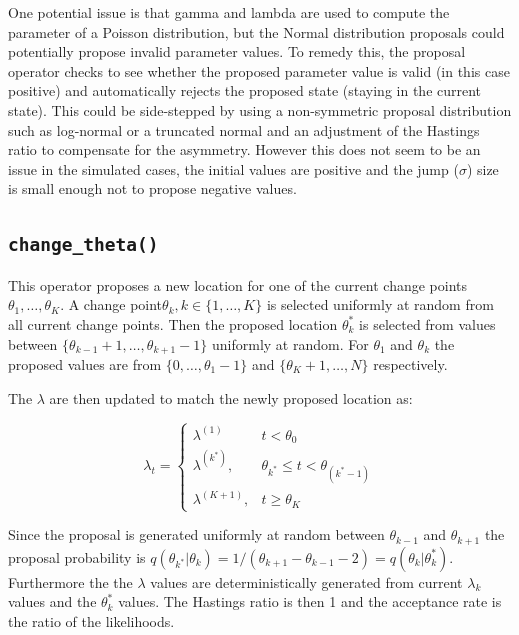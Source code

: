 \documentclass[11pt,a4paper]{article}
\numberwithin{equation}{section}
\begin{document}
One potential issue is that gamma and lambda are used to compute the
parameter of a Poisson distribution, but the Normal distribution
proposals could potentially propose invalid parameter values. To remedy
this, the proposal operator checks to see whether the proposed parameter
value is valid (in this case positive) and automatically rejects the
proposed state (staying in the current state). This could be
side-stepped by using a non-symmetric proposal distribution such as
log-normal or a truncated normal and an adjustment of the Hastings ratio
to compensate for the asymmetry. However this does not seem to be an
issue in the simulated cases, the initial values are positive and the
jump (\(\sigma\)) size is small enough not to propose negative values.

\hypertarget{change_theta}{%
\subsection{\texorpdfstring{\texttt{change\_theta()}}{change\_theta()}}\label{change_theta}}

This operator proposes a new location for one of the current change
points \(\theta_1,\dots, \theta_K\). A change
point\(\theta_k, k \in \{1, \dots, K\}\) is selected uniformly at random
from all current change points. Then the proposed location
\(\theta_k^*\) is selected from values between
\(\{\theta_{k-1}+1,\dots, \theta_{k+1}-1\}\) uniformly at random. For
\(\theta_1\) and \(\theta_k\) the proposed values are from
\(\{0,\dots, \theta_1-1\}\) and \(\{\theta_K+1,\dots, N\}\)
respectively.

The \(\lambda\) are then updated to match the newly proposed location
as:

\[ \lambda_t =  \begin{cases} \lambda^{(1)} & t < \theta_0 \\
\lambda^{(k^*)}, & \theta_{k^*} \leq t < \theta_{(k^*-1)} \\
\lambda^{(K+1)}, & t \geq \theta_K \end{cases}\]

Since the proposal is generated uniformly at random between
\(\theta_{k-1}\) and \(\theta_{k+1}\) the proposal probability is
\(q(\theta_{k^*}|\theta_k) = 1/(\theta_{k+1}-\theta_{k-1}-2) = q(\theta_k|\theta_k^*)\).
Furthermore the the \(\lambda\) values are deterministically generated
from current \(\lambda_k\) values and the \(\theta_k^*\) values. The
Hastings ratio is then 1 and the acceptance rate is the ratio of the
likelihoods.
\end{document}

